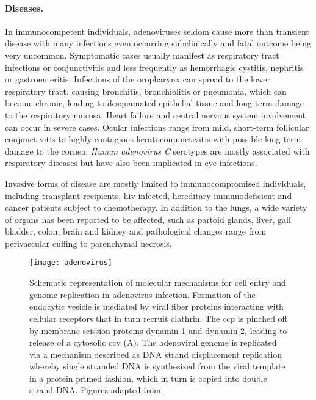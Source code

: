 \paragraph{Diseases.}
In immunocompetent individuals, adenoviruses seldom cause more than transient disease with many infections even occurring subclinically and fatal outcome being very uncommon. Symptomatic cases usually manifest as respiratory tract infections or conjunctivitis and less frequently as hemorrhagic cystitis, nephritis or gastroenteritis. Infections of the oropharynx can spread to the lower respiratory tract, causing bronchitis, bronchiolitis or pneumonia, which can become chronic, leading to desquamated epithelial tissue and long-term damage to the respiratory mucosa. Heart failure and central nervous system involvement can occur in severe cases. Ocular infections range from mild, short-term follicular conjunctivitis to highly contagious keratoconjunctivitis with possible long-term damage to the cornea. \textit{Human adenovirus C} serotypes are mostly associated with respiratory diseases but have also been implicated in eye infections.

Invasive forms of disease are mostly limited to immunocompromised individuals, including transplant recipients, \gls{hiv} infected, hereditary immunodeficient and cancer patients subject to chemotherapy. In addition to the lungs, a wide variety of organs has been reported to be affected, such as partoid glands, liver, gall bladder, colon, brain and kidney and pathological changes range from perivascular cuffing to parenchymal necrosis.

\begin{figure}
  \centering
  \texttt{[image: adenovirus]}
  \caption[Molecular mechanisms of adenovirus infection.]{Schematic representation of molecular mechanisms for cell entry and genome replication in adenovirus infection. Formation of the endocytic vesicle is mediated by viral fiber proteins interacting with cellular receptors that in turn recruit clathrin. The \gls{ccp} is pinched off by membrane scission proteins dynamin-1 and dynamin-2, leading to release of a cytosolic \acrshort{ccv} (A). The adenoviral genome is replicated via a mechanism described as DNA strand displacement replication whereby single stranded DNA is synthesized from the viral template in a protein primed fashion, which in turn is copied into double strand DNA. Figures adapted from \cite{Hulo2011}.}
  \label{fig:adenovirus}
\end{figure}


